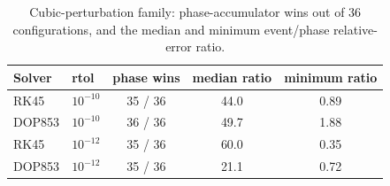\begin{table}[!htbp]
\centering
\caption{Cubic-perturbation family: phase-accumulator wins out of 36 configurations, and the median and minimum event/phase relative-error ratio.}
\label{tab:cubic}
\begin{tabular}{llccc}
\toprule
Solver & rtol & phase wins & median ratio & minimum ratio \\
\midrule
RK45 & $10^{-10}$ & 35 / 36 & 44.0 & 0.89 \\
DOP853 & $10^{-10}$ & 36 / 36 & 49.7 & 1.88 \\
RK45 & $10^{-12}$ & 35 / 36 & 60.0 & 0.35 \\
DOP853 & $10^{-12}$ & 35 / 36 & 21.1 & 0.72 \\
\bottomrule
\end{tabular}
\end{table}
